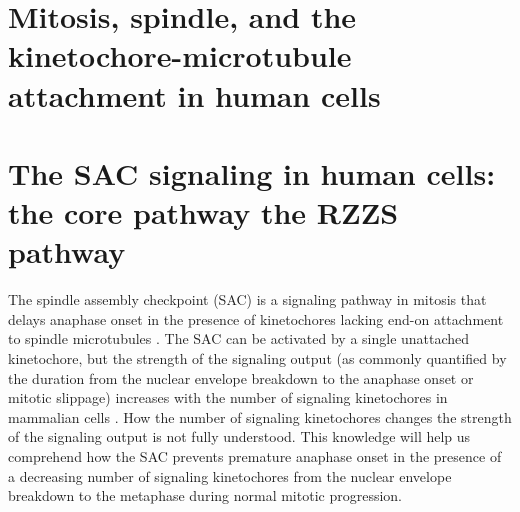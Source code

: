 \section{Mitosis, spindle, and the kinetochore-microtubule attachment in human cells}





\section{The SAC signaling in human cells: the core pathway  the RZZS pathway}


The spindle assembly checkpoint (SAC) is a signaling pathway in mitosis that delays anaphase onset in the presence of kinetochores lacking end-on attachment to spindle microtubules \cite{LateralAttachmentSAC}. The SAC can be activated by a single unattached kinetochore, but the strength of the signaling output (as commonly quantified by the duration from the nuclear envelope breakdown to the anaphase onset or mitotic slippage) increases with the number of signaling kinetochores in mammalian cells \cite{RiederNormalProgression,Rheostat,Ablation}. How the number of signaling kinetochores changes the strength of the signaling output is not fully understood. This knowledge will help us comprehend how the SAC prevents premature anaphase onset in the presence of a decreasing number of signaling kinetochores from the nuclear envelope breakdown to the metaphase during normal mitotic progression.

